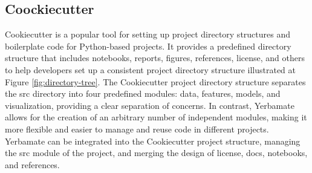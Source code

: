 \subsection{Coockiecutter}
Cookiecutter is a popular tool for setting up project directory structures and boilerplate code for Python-based projects. It provides a predefined directory structure that includes notebooks, reports, figures, references, license, and others to help developers set up a consistent project directory structure illustrated at Figure \ref{fig:directory-tree}. The Cookiecutter project directory structure separates the src directory into four predefined modules: data, features, models, and visualization, providing a clear separation of concerns. In contrast, Yerbamate allows for the creation of an arbitrary number of independent modules, making it more flexible and easier to manage and reuse code in different projects. Yerbamate can be integrated into the Cookiecutter project structure, managing the src module of the project, and merging the design of license, docs, notebooks, and references. 


